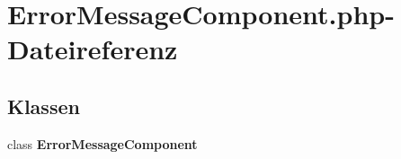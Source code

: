 \section{ErrorMessageComponent.php-Dateireferenz}
\label{ErrorMessageComponent_8php}
\subsection*{Klassen}
\begin{CompactItemize}
\item 
class {\bf ErrorMessageComponent}
\end{CompactItemize}

